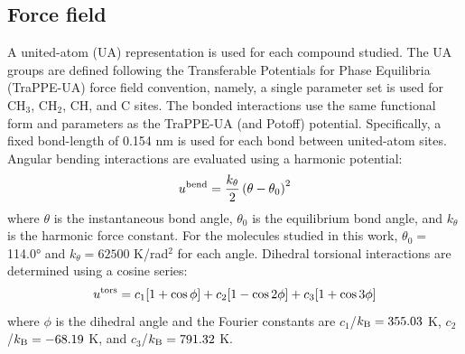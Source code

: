 \documentclass[journal=jctc,manuscript=article]{achemso}
\begin{document}

\subsection{Force field}

A united-atom (UA) representation is used for each compound studied. The UA groups are defined following the Transferable Potentials for Phase Equilibria (TraPPE-UA) force field convention, namely, a single parameter set is used for CH$_3$, CH$_2$, CH, and C sites. The bonded interactions use the same functional form and parameters as the TraPPE-UA (and Potoff) potential. Specifically, a fixed bond-length of 0.154 nm is used for each bond between united-atom sites. Angular bending interactions are evaluated using a harmonic potential:
\begin{equation*}
u^{\rm bend} = \frac{k_\theta}{2} \left(\theta-\theta_0\right)^2
\end{equation*}
where $\theta$ is the instantaneous bond angle, $\theta_0$ is the equilibrium bond angle, and $k_\theta$ is the harmonic force constant. For the molecules studied in this work, $\theta_0 =$ \ang{114.0} and $k_\theta = 62500$ K/rad$^2$ for each angle. Dihedral torsional interactions are determined using a cosine series:
\begin{equation*}
u^{\rm tors} = c_1 [1+\cos{\phi}] + c_2 [1-\cos{2\phi}] + c_3 [1+\cos{3\phi}]
\end{equation*}
where $\phi$ is the dihedral angle and the Fourier constants are $c_1$/$k_{\rm B}=355.03$ K, $c_2$/$k_{\rm B} = -68.19$ K, and $c_3$/$k_{\rm B} = 791.32$ K.
\end{document}
